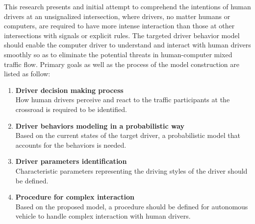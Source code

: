 This research presents and initial attempt to comprehend the intentions of human drivers at an unsignalized intersection, where drivers, no matter humans or computers, are required to have more intense interaction than those at other intersections with signals or explicit rules. The targeted driver behavior model should enable the computer driver to understand and interact with human drivers smoothly so as to eliminate the potential threats in human-computer mixed traffic flow. Primary goals as well as the process of the model construction are listed as follow:

\begin{enumerate}

    \item \textbf{Driver decision making process} \\
        How human drivers perceive and react to the traffic participants at the crossroad is required to be identified.
    \item \textbf{Driver behaviors modeling in a probabilistic way}\\
        Based on the current states of the target driver, a probabilistic model that accounts for the behaviors is needed.
    \item \textbf{Driver parameters identification}\\
        Characteristic parameters representing the driving styles of the driver should be defined.
    \item \textbf{Procedure for complex interaction}\\
        Based on the proposed model, a procedure should be defined for autonomous vehicle to handle complex interaction with human drivers.

\end{enumerate}


